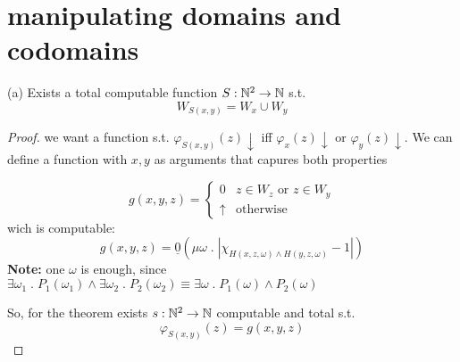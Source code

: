 \section{manipulating domains and codomains}
(a) Exists a total computable function $S : \mathbb{N}^2 \rightarrow \mathbb{N}$
s.t. \[W_{S(x,y)} = W_x \cup W_y\]
\begin{proof}
  we want a function s.t. $\varphi_{S(x,y)}(z)\downarrow$ iff
  $\varphi_x(z)\downarrow$ or $\varphi_y(z) \downarrow$. We can define
  a function with $x,y$ as arguments that capures both properties

  \[
    g(x,y,z) = \begin{cases}
      0 & z \in W_z \mbox{ or } z \in W_y \\
      \uparrow  & \mbox{otherwise}
    \end{cases}
  \]
  wich is computable:
  \[
    g(x,y,z) = \underline{0}(\mu \omega \; . \; |\chi_{H(x,z,\omega)
      \wedge H(y,z,\omega)} - 1|)
  \]
  \textbf{Note:} one $\omega$ is enough, since
  $\exists \omega_1 \; . \; P_1(\omega_1) \wedge \exists \omega_2 \;
  . \; P_2(\omega_2) \equiv \exists \omega \; . \; P_1(\omega) \wedge
  P_2(\omega)$

  So, for the \smn theorem exists $s:\mathbb{N}^2 \rightarrow \mathbb{N}$
  computable and total s.t. \[\varphi_{S(x,y)}(z) = g(x,y,z)\]
\end{proof}

